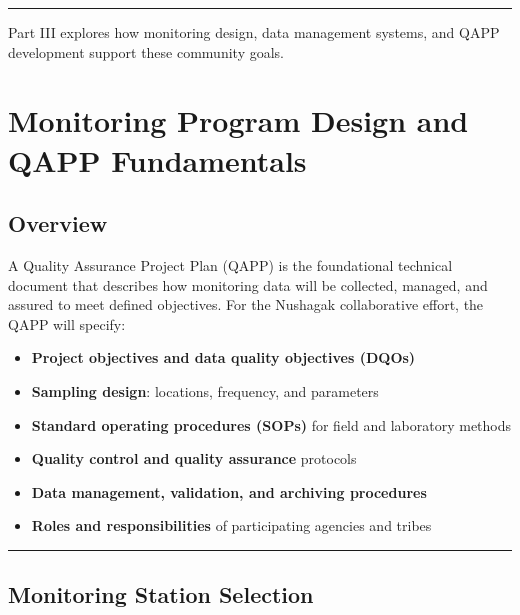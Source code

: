 \documentclass[
  letterpaper,
]{scrbook}
\providecommand{\tightlist}{%
  \setlength{\itemsep}{0pt}\setlength{\parskip}{0pt}}\usepackage{longtable,booktabs,array}
\begin{document}
\begin{center}\rule{0.5\linewidth}{0.5pt}\end{center}

Part III explores how monitoring design, data management systems, and
QAPP development support these community goals.

\chapter{Monitoring Program Design and QAPP
Fundamentals}\label{monitoring-program-design-and-qapp-fundamentals}

\section{Overview}\label{overview-3}

A Quality Assurance Project Plan (QAPP) is the foundational technical
document that describes how monitoring data will be collected, managed,
and assured to meet defined objectives. For the Nushagak collaborative
effort, the QAPP will specify:

\begin{itemize}
\tightlist
\item
  \textbf{Project objectives and data quality objectives (DQOs)}
\item
  \textbf{Sampling design}: locations, frequency, and parameters
\item
  \textbf{Standard operating procedures (SOPs)} for field and laboratory
  methods
\item
  \textbf{Quality control and quality assurance} protocols
\item
  \textbf{Data management, validation, and archiving procedures}
\item
  \textbf{Roles and responsibilities} of participating agencies and
  tribes
\end{itemize}

\begin{center}\rule{0.5\linewidth}{0.5pt}\end{center}

\section{Monitoring Station
Selection}\label{monitoring-station-selection}
\end{document}
